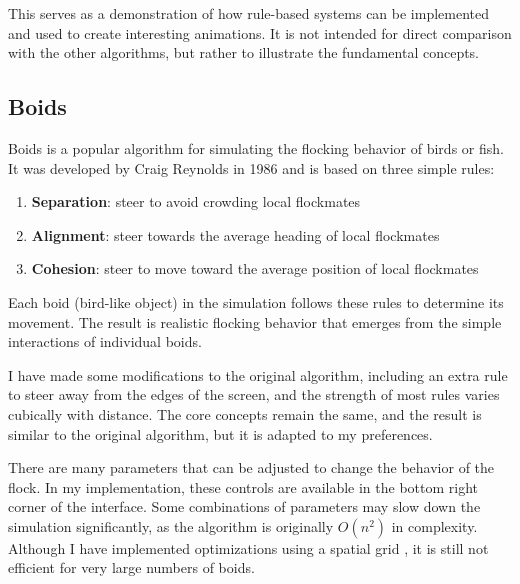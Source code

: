 
This serves as a demonstration of how rule-based systems can be implemented and used to create interesting animations. It is not intended for direct comparison with the other algorithms, but rather to illustrate the fundamental concepts.

\subsection{Boids}
\label{subsec:boids}

Boids is a popular algorithm for simulating the flocking behavior of birds or fish. It was developed by Craig Reynolds in 1986 \cite{boids} and is based on three simple rules:
\begin{enumerate}
    \item \textbf{Separation}: steer to avoid crowding local flockmates
    \item \textbf{Alignment}: steer towards the average heading of local flockmates
    \item \textbf{Cohesion}: steer to move toward the average position of local flockmates
\end{enumerate}

Each boid (bird-like object) in the simulation follows these rules to determine its movement. The result is realistic flocking behavior that emerges from the simple interactions of individual boids.

\begin{Note}
    I have made some modifications to the original algorithm, including an extra rule to steer away from the edges of the screen, and the strength of most rules varies cubically with distance. The core concepts remain the same, and the result is similar to the original algorithm, but it is adapted to my preferences.
\end{Note}


\pagebreak

There are many parameters that can be adjusted to change the behavior of the flock. In my implementation, these controls are available in the bottom right corner of the interface. Some combinations of parameters may slow down the simulation significantly, as the algorithm is originally \(O(n^2)\) in complexity. Although I have implemented optimizations using a spatial grid \cite{spatial-grid}, it is still not efficient for very large numbers of boids.

